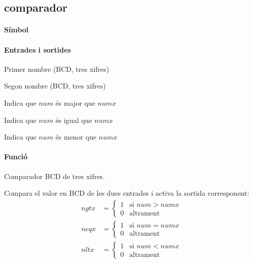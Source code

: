 \subsection{\label{sub:\projectname-comparador} \textsf{comparador}}

\paragraph{Símbol}

\begin{center}  \end{center}

\paragraph{Entrades i sortides}

\begin{where}
\item[\nodenamerange{numx}{11}{0}] Primer nombre (BCD, tres xifres)
\item[\nodenamerange{num}{11}{0}] Segon nombre (BCD, tres xifres)
\item[\nodenamebit{ngtx}] Indica que $num$ és major que $numx$
\item[\nodenamebit{neqx}] Indica que $num$ és igual que $numx$
\item[\nodenamebit{nltx}] Indica que $num$ és menor que $numx$
\end{where}

\paragraph{Funció}

Comparador BCD de tres xifres.

Compara el valor en BCD de les dues entrades i activa la sortida corresponent:
%
\begin{align*}
  ngtx &= \begin{cases}
    1 & \text{si $num > numx$} \\
    0 & \text{altrament}
  \end{cases} \\
  neqx &= \begin{cases}
    1 & \text{si $num = numx$} \\
    0 & \text{altrament}
  \end{cases} \\
  nltx &= \begin{cases}
    1 & \text{si $num < numx$} \\
    0 & \text{altrament}
  \end{cases}
\end{align*}

